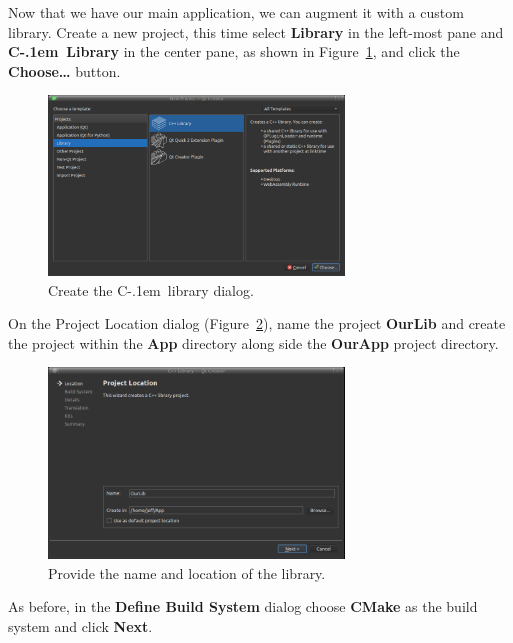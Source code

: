 \documentclass[letterpaper]{article}
\newcommand{\Cpp}{\mbox{C\kern-.1em\raisebox{.35ex}{\smaller{\smaller{+\kern-0.05em+}}}}}
\begin{document}
  Now that we have our main application, we can augment it with a custom library.
  Create a new project, this time select \textbf{Library} in the left-most pane
  and \textbf{\Cpp~Library} in the center pane, as shown in Figure~\ref{fig:create_ourlib_1},
  and click the \textbf{Choose\ldots} button.
  \begin{figure}[H]
    \centering
    \includegraphics[width=0.7\textwidth]{create_ourlib_1.png}
    \caption{Create the \Cpp\ library dialog.}
    \label{fig:create_ourlib_1}
  \end{figure}
  
  On the Project Location dialog (Figure~\ref{fig:create_ourlib_2}), name the project \textbf{OurLib} and create the project within the
  \textbf{App} directory along side the \textbf{OurApp} project directory. 
  \begin{figure}[H]
    \centering
    \includegraphics[width=0.7\textwidth]{create_ourlib_2.png}
    \caption{Provide the name and location of the library.}
    \label{fig:create_ourlib_2}
  \end{figure}

  As before, in the \textbf{Define Build System} dialog
  choose \textbf{CMake} as the build system and click \textbf{Next}.
\end{document}
